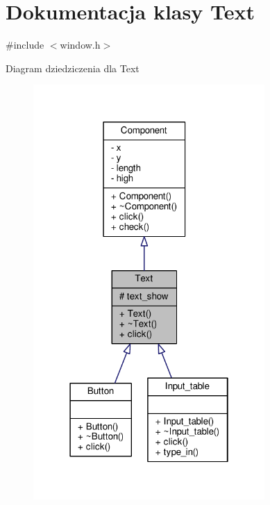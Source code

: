 \hypertarget{classText}{}\section{Dokumentacja klasy Text}
\label{classText}


{\ttfamily \#include $<$window.\+h$>$}



Diagram dziedziczenia dla Text
\nopagebreak
\begin{figure}[H]
\begin{center}
\leavevmode
\includegraphics[width=250pt]{classText__inherit__graph}
\end{center}
\end{figure}


